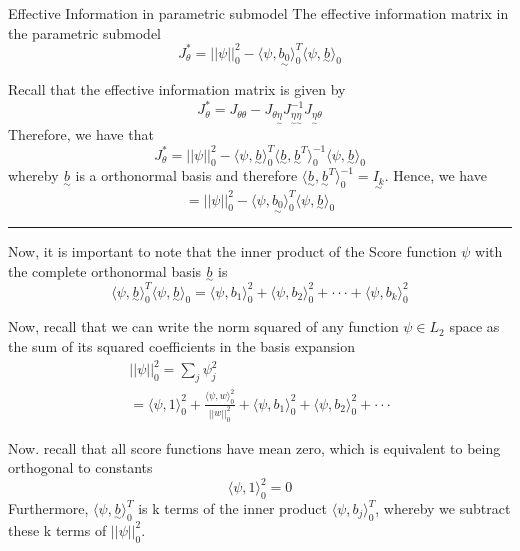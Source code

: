 \documentclass[twoside]{article}
\newenvironment{proof}{{\bf Proof:}}{\hfill\rule{2mm}{2mm}}
\newcommand{\utilde}{\underset{\sim}}
\begin{document}
\begin{proposition_exam}{Effective Information in parametric submodel}{} The effective information matrix in the parametric submodel
$$
J_{\theta}^{*} = ||\psi||_{0}^{2} - \langle \psi, \utilde{b_{0}} \rangle_{0}^T \langle \psi, \utilde{b} \rangle_0
$$
\end{proposition_exam}

\begin{proof} Recall that the effective information matrix is given by 
$$
J_{\theta}^{*} = J_{\theta \theta} - J_{\theta \utilde{\eta}}J_{\utilde{\eta} \utilde{\eta}}^{-1}J_{\utilde{\eta} \theta}
$$
Therefore, we have that 
$$
J_{\theta}^{*} = ||\psi||_{0}^{2} - \langle \psi, \utilde{b} \rangle_{0}^{T}\langle \utilde{b}, \utilde{b}^T \rangle_{0}^{-1} \langle \psi, \utilde{b} \rangle_{0} 
$$
whereby $\utilde{b}$ is a orthonormal basis and therefore $\langle \utilde{b}, \utilde{b}^T \rangle_{0}^{-1}  = \utilde{I_{k}}.$ Hence, we have 
$$
= ||\psi||_{0}^{2} - \langle \psi, \utilde{b_{0}} \rangle_{0}^T \langle \psi, \utilde{b} \rangle_0
$$
\end{proof}

Now, it is important to note that the inner product of the Score function $\psi$ with the complete orthonormal basis $\utilde{b}$ is
\begin{equation}
\langle \psi, \utilde{b} \rangle_{0}^{T} \langle \psi, \utilde{b} \rangle_0 = \langle \psi, b_1 \rangle_{0}^{2} + \langle \psi, b_2 \rangle_{0}^{2} + \cdot \cdot \cdot + \langle \psi, b_k \rangle_{0}^{2}
\end{equation}

Now, recall that we can write the norm squared of any function $\psi \in L_2$ space as the sum of its squared coefficients in the basis expansion
\begin{align}
||\psi||_{0}^{2} = \sum_{j}\psi_{j}^{2}
\\ = \langle \psi, 1 \rangle_{0}^{2} + \frac{\langle \psi, w \rangle_{0}^{2}}{||w||_{0}^{2}} + \langle \psi, b_{1} \rangle_{0}^{2} + \langle \psi, b_{2} \rangle_{0}^{2} + \cdot \cdot \cdot 
\end{align}


Now. recall that all score functions have mean zero, which is equivalent to being orthogonal to constants 
$$
\langle \psi, 1 \rangle_{0}^{2} = 0
$$
Furthermore, $\langle \psi, \utilde{b} \rangle_{0}^{T}$ is k terms of the inner product $\langle \psi, b_j \rangle_{0}^{T}$, whereby we subtract these k terms of $||\psi||_{0}^{2}$.
\end{document}
